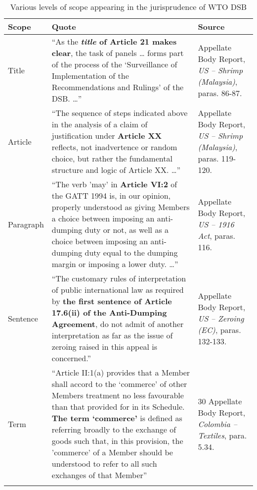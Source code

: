 \begin{xltabular}{\linewidth}{lXX}
    \hline
    \textbf{\normalsize Scope} 
    & \textbf{\normalsize Quote}
    & \textbf{\normalsize Source}
    \\
    \endfirsthead
    \hline \hline

    Title
    & ``As the \textbf{\textit{title}
    of Article 21 makes clear}, 
    the task of panels \ldots
    forms part of the process
    of the `Surveillance of 
    Implementation of the 
    Recommendations and Rulings' of the
    DSB. \ldots'' 
    & Appellate Body Report, \textit{US – Shrimp (Malaysia)}, paras. 86-87.
    \\
    Article 
    &  ``The sequence of steps indicated above in the analysis of a claim of justification under \textbf{Article XX} reflects, not inadvertence or random choice, but rather the fundamental structure and logic of Article XX. \ldots''
    & Appellate Body Report, \textit{US – Shrimp (Malaysia)}, paras. 119-120.
    \\
    Paragraph
    &  ``The verb 'may' in \textbf{Article VI:2} of the GATT 1994 is, in our opinion, properly
    understood as giving Members a choice between imposing an anti-dumping duty or
    not, as well as a choice between imposing an anti-dumping duty equal to the dumping
    margin or imposing a lower duty. \ldots''
    & Appellate Body Report, \textit{US – 1916 Act}, paras. 116.     
    \\
    Sentence 
    & ``The customary rules of interpretation of public international law as
    required by \textbf{the first sentence of Article 17.6(ii) of the Anti-Dumping Agreement}, do
    not admit of another interpretation as far as the issue of zeroing raised in this appeal
    is concerned.''
    & Appellate Body Report, \textit{US – Zeroing (EC)}, paras. 132-133.
    \\
    Term
    & ``Article II:1(a) provides that a
    Member shall accord to the `commerce' of other Members treatment no less
    favourable than that provided for in its Schedule. \textbf{The term `commerce'} is defined as
    referring broadly to the exchange of goods such that, in this provision, the 'commerce'
    of a Member should be understood to refer to all such exchanges of that Member''
    & 30 Appellate Body Report, \textit{Colombia – Textiles}, para. 5.34.
    \\
    \hline
    \caption{Various levels of scope appearing in the jurisprudence of WTO DSB}
    \label{xltabular:level-of-scopes}

\end{xltabular}


